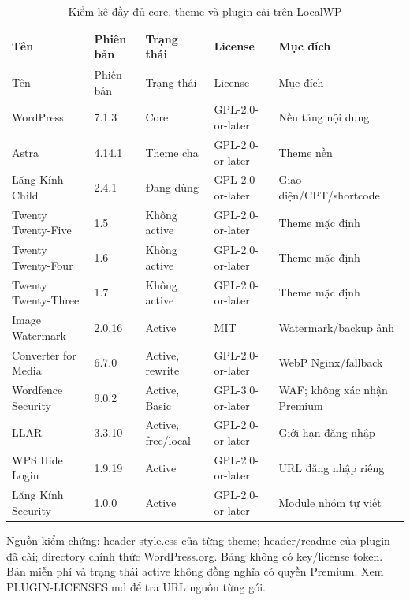 \begingroup\small\setlength{\tabcolsep}{3pt}
\begin{longtable}{P{3.4cm}P{1.2cm}P{2.4cm}P{2.7cm}P{4.1cm}}
\caption{Kiểm kê đầy đủ core, theme và plugin cài trên LocalWP}\label{tab:plugins}\\\toprule Tên & Phiên bản & Trạng thái & License & Mục đích\\\midrule\endfirsthead
\toprule Tên & Phiên bản & Trạng thái & License & Mục đích\\\midrule\endhead
WordPress & 7.1.3 & Core & GPL-2.0-or-later & Nền tảng nội dung\\
Astra & 4.14.1 & Theme cha & GPL-2.0-or-later & Theme nền\\
Lăng Kính Child & 2.4.1 & Đang dùng & GPL-2.0-or-later & Giao diện/CPT/shortcode\\
Twenty Twenty-Five & 1.5 & Không active & GPL-2.0-or-later & Theme mặc định\\
Twenty Twenty-Four & 1.6 & Không active & GPL-2.0-or-later & Theme mặc định\\
Twenty Twenty-Three & 1.7 & Không active & GPL-2.0-or-later & Theme mặc định\\
Image Watermark & 2.0.16 & Active & MIT & Watermark/backup ảnh\\
Converter for Media & 6.7.0 & Active, rewrite & GPL-2.0-or-later & WebP Nginx/fallback\\
Wordfence Security & 9.0.2 & Active, Basic & GPL-3.0-or-later & WAF; không xác nhận Premium\\
LLAR & 3.3.10 & Active, free/local & GPL-2.0-or-later & Giới hạn đăng nhập\\
WPS Hide Login & 1.9.19 & Active & GPL-2.0-or-later & URL đăng nhập riêng\\
Lăng Kính Security & 1.0.0 & Active & GPL-2.0-or-later & Module nhóm tự viết\\
\bottomrule\end{longtable}\endgroup
Nguồn kiểm chứng: header style.css của từng theme; header/readme của plugin đã cài; directory chính thức WordPress.org. Bảng không có key/license token. Bản miễn phí và trạng thái active không đồng nghĩa có quyền Premium. Xem PLUGIN-LICENSES.md để tra URL nguồn từng gói.\cite{plugins}
